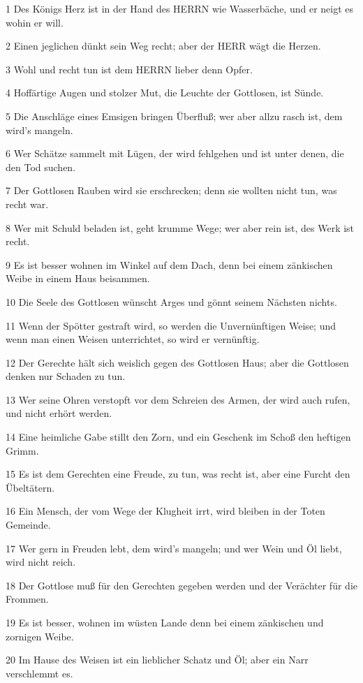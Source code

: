 \par 1 Des Königs Herz ist in der Hand des HERRN wie Wasserbäche, und er neigt es wohin er will.
\par 2 Einen jeglichen dünkt sein Weg recht; aber der HERR wägt die Herzen.
\par 3 Wohl und recht tun ist dem HERRN lieber denn Opfer.
\par 4 Hoffärtige Augen und stolzer Mut, die Leuchte der Gottlosen, ist Sünde.
\par 5 Die Anschläge eines Emsigen bringen Überfluß; wer aber allzu rasch ist, dem wird's mangeln.
\par 6 Wer Schätze sammelt mit Lügen, der wird fehlgehen und ist unter denen, die den Tod suchen.
\par 7 Der Gottlosen Rauben wird sie erschrecken; denn sie wollten nicht tun, was recht war.
\par 8 Wer mit Schuld beladen ist, geht krumme Wege; wer aber rein ist, des Werk ist recht.
\par 9 Es ist besser wohnen im Winkel auf dem Dach, denn bei einem zänkischen Weibe in einem Haus beisammen.
\par 10 Die Seele des Gottlosen wünscht Arges und gönnt seinem Nächsten nichts.
\par 11 Wenn der Spötter gestraft wird, so werden die Unvernünftigen Weise; und wenn man einen Weisen unterrichtet, so wird er vernünftig.
\par 12 Der Gerechte hält sich weislich gegen des Gottlosen Haus; aber die Gottlosen denken nur Schaden zu tun.
\par 13 Wer seine Ohren verstopft vor dem Schreien des Armen, der wird auch rufen, und nicht erhört werden.
\par 14 Eine heimliche Gabe stillt den Zorn, und ein Geschenk im Schoß den heftigen Grimm.
\par 15 Es ist dem Gerechten eine Freude, zu tun, was recht ist, aber eine Furcht den Übeltätern.
\par 16 Ein Mensch, der vom Wege der Klugheit irrt, wird bleiben in der Toten Gemeinde.
\par 17 Wer gern in Freuden lebt, dem wird's mangeln; und wer Wein und Öl liebt, wird nicht reich.
\par 18 Der Gottlose muß für den Gerechten gegeben werden und der Verächter für die Frommen.
\par 19 Es ist besser, wohnen im wüsten Lande denn bei einem zänkischen und zornigen Weibe.
\par 20 Im Hause des Weisen ist ein lieblicher Schatz und Öl; aber ein Narr verschlemmt es.
